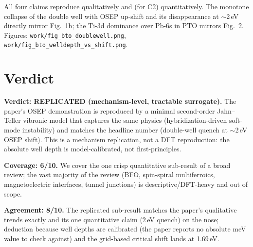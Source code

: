 \documentclass[11pt]{article}
\begin{document}
All four claims reproduce qualitatively and (for C2) quantitatively. The
monotone collapse of the double well with OSEP up-shift and its disappearance at
$\sim$2\,eV directly mirror Fig.~1b; the Ti-3d dominance over Pb-6s in PTO
mirrors Fig.~2. Figures: \texttt{work/fig\_bto\_doublewell.png},
\texttt{work/fig\_bto\_welldepth\_vs\_shift.png}.

\section{Verdict}
\textbf{Verdict: REPLICATED (mechanism-level, tractable surrogate).}
The paper's OSEP demonstration is reproduced by a minimal second-order
Jahn--Teller vibronic model that captures the same physics (hybridization-driven
soft-mode instability) and matches the headline number (double-well quench at
$\sim$2\,eV OSEP shift). This is a mechanism replication, not a DFT reproduction:
the absolute well depth is model-calibrated, not first-principles.

\textbf{Coverage: 6/10.} We cover the one crisp quantitative sub-result of a
broad review; the vast majority of the review (BFO, spin-spiral multiferroics,
magnetoelectric interfaces, tunnel junctions) is descriptive/DFT-heavy and out
of scope.

\textbf{Agreement: 8/10.} The replicated sub-result matches the paper's
qualitative trends exactly and its one quantitative claim (2\,eV quench) on the
nose; deduction because well depths are calibrated (the paper reports no absolute
meV value to check against) and the grid-based critical shift lands at 1.69\,eV.
\end{document}

